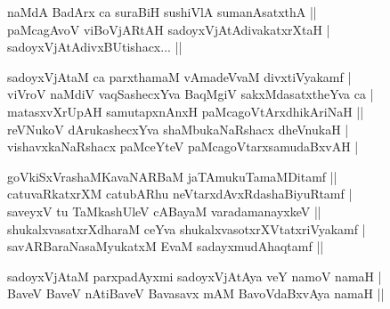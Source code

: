 \begin{entry}
\begin{shl}
naMdA BadArx ca suraBiH sushiVlA sumanAsatxthA ||\\
paMcagAvoV viBoVjARtAH sadoyxVjAtAdivakatxrXtaH |\\
sadoyxVjAtAdivxBUtishacx... ||
\end{shl}
\begin{shl}
sadoyxVjAtaM ca parxthamaM vAmadeVvaM divxtiVyakamf |\\
viVroV naMdiV vaqSashecxYva BaqMgiV sakxMdasatxtheYva ca |\\
matasxvXrUpAH samutapxnAnxH paMcagoVtArxdhikAriNaH ||\\
reVNukoV dArukashecxYva shaMbukaNaRshacx dheVnukaH |\\
vishavxkaNaRshacx paMceYteV paMcagoVtarxsamudaBxvAH |
\end{shl}
\begin{shl}
goVkiSxVrashaMKavaNARBaM jaTAmukuTamaMDitamf ||\\
catuvaRkatxrXM catubARhu neVtarxdAvxRdashaBiyuRtamf |\\
saveyxV tu TaMkashUleV cABayaM varadamanayxkeV ||\\
shukalxvasatxrXdharaM ceYva shukalxvasotxrXVtatxriVyakamf |\\
savARBaraNasaMyukatxM EvaM sadayxmudAhaqtamf ||
\end{shl}
\begin{shl}
sadoyxVjAtaM parxpadAyxmi sadoyxVjAtAya veY namoV namaH |\\
BaveV BaveV nAtiBaveV Bavasavx mAM BavoVdaBxvAya namaH ||
\end{shl}

\end{entry}
